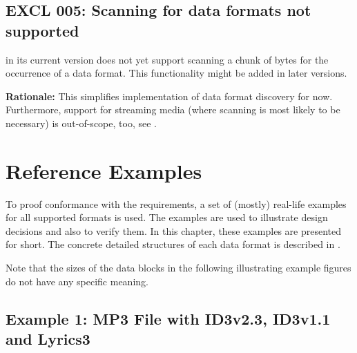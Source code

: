 \section{EXCL 005: Scanning for data formats not supported}%
\label{sec:EXCL005Scanningfordataformatsnotsupported}%

\LibName{} in its current version does not yet support scanning a chunk of bytes for the occurrence of a data format. This functionality might be added in later versions.

\textbf{Rationale:} This simplifies implementation of data format discovery for now. Furthermore, support for streaming media (where scanning is most likely to be necessary) is out-of-scope, too, see .


\chapter{Reference Examples}
\label{sec:ReferenceExamples}

To proof conformance with the \LibName{} requirements, a set of (mostly) real-life examples for all supported formats is used. The examples are used to illustrate design decisions and also to verify them. In this chapter, these examples are presented for short. The concrete detailed structures of each data format is described in \cite{MC17}.

Note that the sizes of the data blocks in the following illustrating example figures do not have any specific meaning.


\section{Example 1: MP3 File with ID3v2.3, ID3v1.1 and Lyrics3}
\label{sec:Example1MP3FileWithID3v23AndID3v11}

